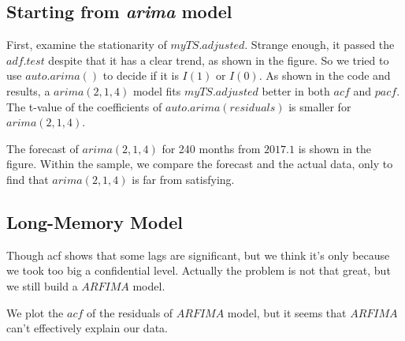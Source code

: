 \documentclass[a4paper,10pt]{article}
\begin{document}
\subsection{Starting from \textit{arima} model}
First, examine the stationarity of $myTS.adjusted$. Strange enough, it passed the $adf.test$ despite that it has a clear trend, as shown in the figure. So we tried to use $auto.arima()$ to decide if it is $I(1)$ or $I(0)$. As shown in the code and results, a $arima(2, 1, 4)$ model fits $myTS.adjusted$ better in both $acf$ and $pacf$. The t-value of the coefficients of $auto.arima(residuals)$ is smaller for $arima(2, 1, 4)$.\par
The forecast of $arima(2, 1, 4)$ for 240 months from $2017.1$ is shown in the figure. Within the sample, we compare the forecast and the actual data, only to find that $arima(2, 1, 4)$ is far from satisfying. 

\subsection{Long-Memory Model}
Though acf shows that some lags are significant, but we think it's only because we took too big a confidential level. Actually the problem is not that great, but we still build a $ARFIMA$ model. \par
We plot the $acf$ of the residuals of $ARFIMA$ model, but it seems that $ARFIMA$ can't effectively explain our data.
\end{document}
